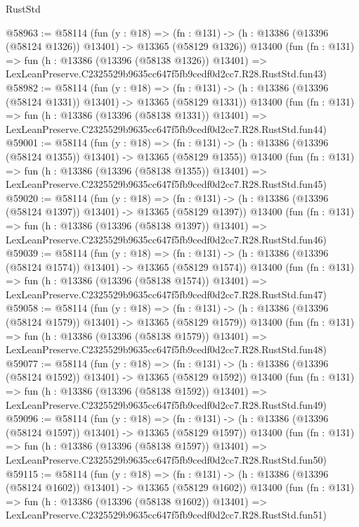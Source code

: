 \begin{lexlean}{RustStd}
\begin{coremodule}
@58963 := @58114
    (fun (y : @18) =>
    (fn : @131) -> (h : @13386 (@13396 (@58124 @1326)) @13401) -> @13365 (@58129 @1326))
    @13400
    (fun (fn : @131) =>
    fun (h : @13386 (@13396 (@58138 @1326)) @13401) =>
    LexLeanPreserve.C2325529b9635cc647f5fb9cedf0d2cc7.R28.RustStd.fun43)
@58982 := @58114
    (fun (y : @18) =>
    (fn : @131) -> (h : @13386 (@13396 (@58124 @1331)) @13401) -> @13365 (@58129 @1331))
    @13400
    (fun (fn : @131) =>
    fun (h : @13386 (@13396 (@58138 @1331)) @13401) =>
    LexLeanPreserve.C2325529b9635cc647f5fb9cedf0d2cc7.R28.RustStd.fun44)
@59001 := @58114
    (fun (y : @18) =>
    (fn : @131) -> (h : @13386 (@13396 (@58124 @1355)) @13401) -> @13365 (@58129 @1355))
    @13400
    (fun (fn : @131) =>
    fun (h : @13386 (@13396 (@58138 @1355)) @13401) =>
    LexLeanPreserve.C2325529b9635cc647f5fb9cedf0d2cc7.R28.RustStd.fun45)
@59020 := @58114
    (fun (y : @18) =>
    (fn : @131) -> (h : @13386 (@13396 (@58124 @1397)) @13401) -> @13365 (@58129 @1397))
    @13400
    (fun (fn : @131) =>
    fun (h : @13386 (@13396 (@58138 @1397)) @13401) =>
    LexLeanPreserve.C2325529b9635cc647f5fb9cedf0d2cc7.R28.RustStd.fun46)
@59039 := @58114
    (fun (y : @18) =>
    (fn : @131) -> (h : @13386 (@13396 (@58124 @1574)) @13401) -> @13365 (@58129 @1574))
    @13400
    (fun (fn : @131) =>
    fun (h : @13386 (@13396 (@58138 @1574)) @13401) =>
    LexLeanPreserve.C2325529b9635cc647f5fb9cedf0d2cc7.R28.RustStd.fun47)
@59058 := @58114
    (fun (y : @18) =>
    (fn : @131) -> (h : @13386 (@13396 (@58124 @1579)) @13401) -> @13365 (@58129 @1579))
    @13400
    (fun (fn : @131) =>
    fun (h : @13386 (@13396 (@58138 @1579)) @13401) =>
    LexLeanPreserve.C2325529b9635cc647f5fb9cedf0d2cc7.R28.RustStd.fun48)
@59077 := @58114
    (fun (y : @18) =>
    (fn : @131) -> (h : @13386 (@13396 (@58124 @1592)) @13401) -> @13365 (@58129 @1592))
    @13400
    (fun (fn : @131) =>
    fun (h : @13386 (@13396 (@58138 @1592)) @13401) =>
    LexLeanPreserve.C2325529b9635cc647f5fb9cedf0d2cc7.R28.RustStd.fun49)
@59096 := @58114
    (fun (y : @18) =>
    (fn : @131) -> (h : @13386 (@13396 (@58124 @1597)) @13401) -> @13365 (@58129 @1597))
    @13400
    (fun (fn : @131) =>
    fun (h : @13386 (@13396 (@58138 @1597)) @13401) =>
    LexLeanPreserve.C2325529b9635cc647f5fb9cedf0d2cc7.R28.RustStd.fun50)
@59115 := @58114
    (fun (y : @18) =>
    (fn : @131) -> (h : @13386 (@13396 (@58124 @1602)) @13401) -> @13365 (@58129 @1602))
    @13400
    (fun (fn : @131) =>
    fun (h : @13386 (@13396 (@58138 @1602)) @13401) =>
    LexLeanPreserve.C2325529b9635cc647f5fb9cedf0d2cc7.R28.RustStd.fun51)

\end{coremodule}
\end{lexlean}
